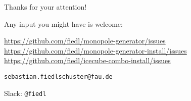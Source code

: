 
\begin{frame}{Thanks for your attention!}
  \begin{center}
    Any input you might have is welcome: \\ \vspace{0.3cm}

    \url{https://github.com/fiedl/monopole-generator/issues} \\ \vspace{0.2cm}
    \url{https://github.com/fiedl/monopole-generator-install/issues} \\ \vspace{0.2cm}
    \url{https://github.com/fiedl/icecube-combo-install/issues} \\ \vspace{0.5cm}

    \texttt{sebastian.fiedlschuster@fau.de}

    Slack: \texttt{@fiedl}

    \vspace{1.5cm}

  \end{center}
\end{frame}
